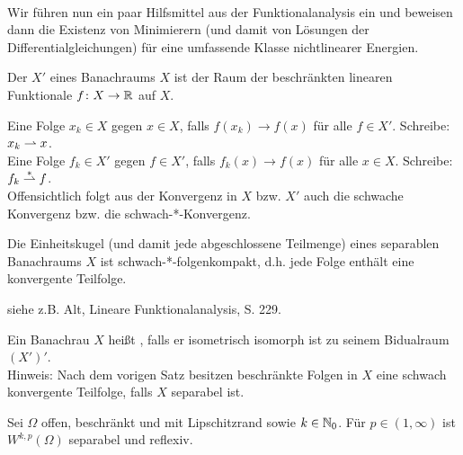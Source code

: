 \mbox{} \\
Wir führen nun ein paar Hilfsmittel aus der Funktionalanalysis ein und beweisen dann die Existenz von Minimierern (und damit von Lösungen der Differentialgleichungen) für eine umfassende Klasse nichtlinearer Energien.

\begin{defn}[Dualraum] \label{def_76}
	Der  $X'$ \marginnote{[76]} eines Banachraums $X$ ist der Raum der beschränkten linearen Funktionale $f\colon X \rightarrow \mathbb{R}$ auf $X$.
\end{defn}

\begin{defn} \label{def_77}
	Eine Folge $x_k \in X$  gegen $x \in X$, falls $f(x_k) \rightarrow f(x)$ für alle $f \in X'$. Schreibe: $x_k \rightharpoonup x$. \marginnote{[77]} \\
	Eine Folge $f_k \in X'$  gegen $f \in X'$, falls $f_k(x) \rightarrow f(x)$ für alle $x \in X$. Schreibe: $f_k \overset{*}{\rightharpoonup} f$.  \\
	Offensichtlich folgt aus der Konvergenz in $X$ bzw. $X'$ auch die schwache Konvergenz bzw. die schwach-*-Konvergenz.
\end{defn}
	
\begin{thm} \label{thm_78}
	Die Einheitskugel (und damit jede abgeschlossene Teilmenge)\marginnote{[78]} eines separablen Banachraums $X$ ist schwach-*-folgenkompakt, d.h. jede Folge enthält eine konvergente Teilfolge.
\end{thm}

	siehe z.B. Alt, \glqq Lineare Funktionalanalysis\grqq, S. 229.
	
\begin{defn}[Reflexivität] \label{def_79}
	Ein Banachrau $X$ heißt , falls er isometrisch isomorph ist zu seinem Bidualraum $(X')'$. \marginnote{[79]} \\
	Hinweis: Nach dem vorigen Satz besitzen beschränkte Folgen in $X$ eine schwach konvergente Teilfolge, falls $X$ separabel ist.
\end{defn}

\begin{thm} \label{thm_80}
	Sei $\Omega$ offen, beschränkt und mit Lipschitzrand sowie $k \in \mathbb{N}_0$. Für $p \in (1,\infty)$ ist $W^{k,p}(\Omega)$ separabel und reflexiv. \marginnote{[80]}
\end{thm}
	
